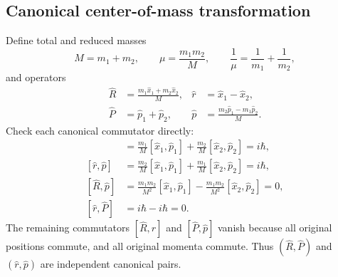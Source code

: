 \documentclass[11pt,a4paper]{article}
\theoremstyle{definition}
\begin{document}
\subsection{Canonical center-of-mass transformation}
Define total and reduced masses
\begin{equation}
M=m_1+m_2,\qquad \mu=\frac{m_1m_2}{M},\qquad \frac1\mu=\frac1{m_1}+\frac1{m_2},
\end{equation}
and operators
\begin{align}
\hat R&=\frac{m_1\hat x_1+m_2\hat x_2}{M}, & \hat r&=\hat x_1-\hat x_2,\\
\hat P&=\hat p_1+\hat p_2, & \hat p&=\frac{m_2\hat p_1-m_1\hat p_2}{M}.
\label{eq:com}
\end{align}
Check each canonical commutator directly:
\begin{align}
[\hat R,\hat P]
&=\frac{m_1}{M}[\hat x_1,\hat p_1]+\frac{m_2}{M}[\hat x_2,\hat p_2]
=i\hbar,\\
[\hat r,\hat p]
&=\frac{m_2}{M}[\hat x_1,\hat p_1]+\frac{m_1}{M}[\hat x_2,\hat p_2]
=i\hbar,\\
[\hat R,\hat p]
&=\frac{m_1m_2}{M^2}[\hat x_1,\hat p_1]
-\frac{m_1m_2}{M^2}[\hat x_2,\hat p_2]=0,\\
[\hat r,\hat P]&=i\hbar-i\hbar=0.
\end{align}
The remaining commutators \([\hat R,\hat r]\) and \([\hat P,\hat p]\) vanish because all original positions commute, and all original momenta commute. Thus \((\hat R,\hat P)\) and \((\hat r,\hat p)\) are independent canonical pairs.
\end{document}

